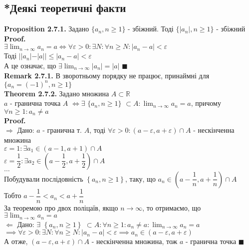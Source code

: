 \documentclass[a4paper, 14pt]{extarticle}
\def\huge{\displaystyle}
\def\bigline{\vspace{5mm}\\}
\def\rm#1{\textbf{Remark {#1}}}
\def\prp#1{\textbf{Proposition {#1}}}
\def\th#1{\textbf{Theorem {#1}}}
\def\proof{\textbf{Proof.}\\}
\def\bigline{\vspace{5mm}\\}
\def\qed{$\blacksquare$}
\def\sequence#1{$\displaystyle \left\{ {#1}, n\geq1 \right\}$}
\def\rightproof{$\boxed{\Rightarrow}$ }
\def\leftproof{$\boxed{\Leftarrow}$ }
\begin{document}
	\subsection{*Деякі теоретичні факти}
	\prp{2.7.1.} Задано $\{a_n, n \geq 1 \}$ - збіжний. Тоді $\{|a_n|,n \geq 1\}$ - збіжний\\
	\proof
	$\exists \huge \lim_{n \to \infty} a_n = a \iff \forall \varepsilon > 0: \exists N: \forall n \geq N: |a_n-a|<\varepsilon$\\
	Тоді $||a_n| - |a|| \leq |a_n - a| < \varepsilon$\\
	А це означає, що $\exists \huge \lim_{n \to \infty} |a_n| = |a|$ \qed
	\bigline
	\rm{2.7.1.} В зворотньому порядку не працює, принаймні для \\ $\{a_n = (-1)^n, n \geq 1\}$
	\bigline
	\th{2.7.2.} Задано множина $A \subset \mathbb{R}$\\
	$a$ - гранична точка $A$ $\iff \exists$ $\{a_n, n \geq 1\}$ $\subset A: \huge \lim_{n \to \infty} a_n = a$, причому $\forall n \geq 1: a_n \neq a$
	\\
	\proof
	\rightproof Дано: $a$ - гранична т. $A$, тоді $\forall \varepsilon > 0: (a-\varepsilon, a + \varepsilon) \cap A$ - нескінченна множина\\
	$\varepsilon = 1: \exists a_1 \in (a-1,a+1) \cap A$\\
	$\varepsilon = \dfrac{1}{2}: \exists a_2 \in (a-\dfrac{1}{2}, a+\dfrac{1}{2}) \cap A$\\
	$\dots$\\
	Побудували послідовність \sequence{a_n}, таку, що $a_n \in (a-\dfrac{1}{n}, a+\dfrac{1}{n}) \cap A$\\
	Тобто $a - \dfrac{1}{n} < a_n < a + \dfrac{1}{n}$\\
	За теоремою про двох поліцаїв, якщо $n \to \infty$, то отримаємо, що \\ $\exists \huge \lim_{n \to \infty} a_n = a$
	\bigline
	
	\leftproof Дано: $\exists$ \sequence{a_n} $\subset A: \forall n \geq 1: a_n \neq a: \huge \lim_{n \to \infty} a_n = a$\\
	$\implies \forall \varepsilon > 0: \exists N: \forall n \geq N: |a_n-a|<\varepsilon \implies a_n \in (a-\varepsilon,a+\varepsilon)$\\
	А отже, $(a-\varepsilon,a+\varepsilon) \cap A$ - нескінченна множина, тож $a$ - гранична точка \qed
	
\end{document}
